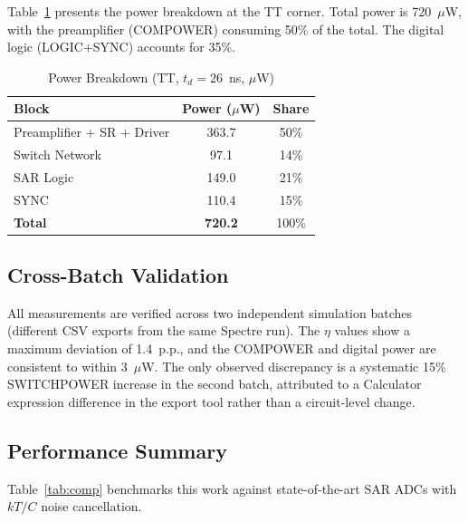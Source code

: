 \documentclass[journal]{IEEEtran}
\begin{document}
Table~\ref{tab:power} presents the power breakdown at the TT corner. Total power is 720~$\mu$W, with the preamplifier (COMPOWER) consuming 50\% of the total. The digital logic (LOGIC+SYNC) accounts for 35\%.

\begin{table}[htbp]
\centering
\caption{Power Breakdown (TT, $t_d=26$~ns, $\mu$W)}
\label{tab:power}
\small
\begin{tabular}{lcc}
\toprule
\textbf{Block} & \textbf{Power ($\mu$W)} & \textbf{Share} \\
\midrule
Preamplifier + SR + Driver & 363.7 & 50\% \\
Switch Network & 97.1 & 14\% \\
SAR Logic & 149.0 & 21\% \\
SYNC & 110.4 & 15\% \\
\midrule
\textbf{Total} & \textbf{720.2} & 100\% \\
\bottomrule
\end{tabular}
\end{table}

\subsection{Cross-Batch Validation}

All measurements are verified across two independent simulation batches (different CSV exports from the same Spectre run). The $\eta$ values show a maximum deviation of 1.4~p.p., and the COMPOWER and digital power are consistent to within 3~$\mu$W. The only observed discrepancy is a systematic 15\% SWITCHPOWER increase in the second batch, attributed to a Calculator expression difference in the export tool rather than a circuit-level change.

\subsection{Performance Summary}

Table~\ref{tab:comp} benchmarks this work against state-of-the-art SAR ADCs with $kT/C$ noise cancellation.
\end{document}
